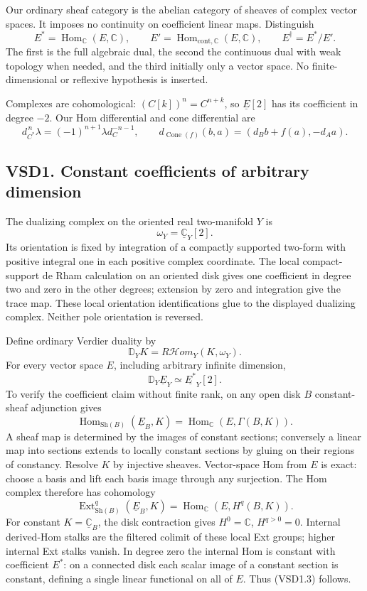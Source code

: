 Our ordinary sheaf category is the abelian category of sheaves of
complex vector spaces. It imposes no continuity on coefficient linear
maps. Distinguish \[
E^*=\operatorname{Hom}_{\mathbb C}(E,\mathbb C),\qquad
E'=\operatorname{Hom}_{\mathrm{cont},\mathbb C}(E,\mathbb C),\qquad
E^\dagger=E^*/E'.
\tag{VSD0.6}
\] The first is the full algebraic dual, the second the continuous dual
with weak topology when needed, and the third initially only a vector
space. No finite-dimensional or reflexive hypothesis is inserted.

Complexes are cohomological: \((C[k])^n=C^{n+k}\), so
\(\underline E[2]\) has its coefficient in degree \(-2\). Our Hom
differential and cone differential are \[
d_{C^*}^{\,n}\lambda=(-1)^{n+1}\lambda d_C^{-n-1},
\qquad d_{\operatorname{Cone}(f)}(b,a)=(d_Bb+f(a),-d_Aa).
\tag{VSD0.7}
\]

\subsection{VSD1. Constant coefficients of arbitrary
dimension}\label{vsd1.-constant-coefficients-of-arbitrary-dimension}

The dualizing complex on the oriented real two-manifold \(Y\) is \[
\omega_Y=\underline{\mathbb C}_Y[2].
\tag{VSD1.1}
\] Its orientation is fixed by integration of a compactly supported
two-form with positive integral one in each positive complex coordinate.
The local compact-support de Rham calculation on an oriented disk gives
one coefficient in degree two and zero in the other degrees; extension
by zero and integration give the trace map. These local orientation
identifications glue to the displayed dualizing complex. Neither pole
orientation is reversed.

Define ordinary Verdier duality by \[
\mathbb D_Y K=R\mathcal Hom_Y(K,\omega_Y).
\tag{VSD1.2}
\] For every vector space \(E\), including arbitrary infinite dimension,
\[
\boxed{\mathbb D_Y\underline E_Y\simeq\underline{E^*}_Y[2].}
\tag{VSD1.3}
\] To verify the coefficient claim without finite rank, on any open disk
\(B\) constant-sheaf adjunction gives \[
\operatorname{Hom}_{\mathrm{Sh}(B)}(\underline E_B,K)
=\operatorname{Hom}_{\mathbb C}(E,\Gamma(B,K)).
\tag{VSD1.4}
\] A sheaf map is determined by the images of constant sections;
conversely a linear map into sections extends to locally constant
sections by gluing on their regions of constancy. Resolve \(K\) by
injective sheaves. Vector-space Hom from \(E\) is exact: choose a basis
and lift each basis image through any surjection. The Hom complex
therefore has cohomology \[
\operatorname{Ext}_{\mathrm{Sh}(B)}^q(\underline E_B,K)
=\operatorname{Hom}_{\mathbb C}(E,H^q(B,K)).
\tag{VSD1.5}
\] For constant \(K=\underline{\mathbb C}_B\), the disk contraction
gives \(H^0=\mathbb C\), \(H^{q>0}=0\). Internal derived-Hom stalks are
the filtered colimit of these local Ext groups; higher internal Ext
stalks vanish. In degree zero the internal Hom is constant with
coefficient \(E^*\): on a connected disk each scalar image of a constant
section is constant, defining a single linear functional on all of
\(E\). Thus (VSD1.3) follows.

